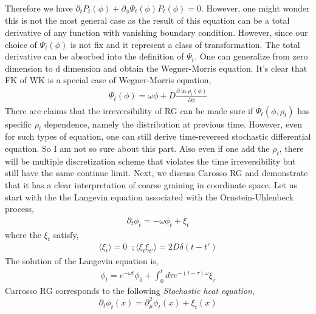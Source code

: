 \documentclass[a4paper,11pt]{article}
\begin{document}
Therefore we have $\partial_tP_{t}(\phi)+ \partial_{\phi}\Psi_t(\phi)P_{t}(\phi)=0$. However, one might wonder this is not the most general case as the result of this equation can be a total derivative of any function with vanishing boundary condition. However, since our choice of $\Psi_t(\phi)$ is not fix and it represent a class of transformation. The total derivative can be absorbed into the definition of $\Psi_t$. One can generalize from zero dimension to d dimension and obtain the Wegner-Morris equation. It's clear that FK of WK is a special case of Wegner-Morris equation,
\begin{equation}
\begin{split}
\Psi_t(\phi)=\omega \phi+ D\frac{\partial \ln \rho_t(\phi)}{\partial \phi}
\end{split}
\end{equation}
There are claims that the irreversibility of RG can be made sure if $\Psi_t(\phi,\rho_t)$ has specific $\rho_t$ dependence, namely the distribution at previous time. {\color{red} However, even for such types of equation, one can still derive time-reversed stochastic differential equation. So I am not so sure about this part. Also even if one add the $\rho_t$, there will be multiple discretization scheme that violates the time irreversibility but still have the same continue limit. } Next, we discuss Carosso RG and demonstrate that it has a clear interpretation of coarse graining in coordinate space. Let us start with the the Langevin equation associated with the Ornstein-Uhlenbeck process,
\begin{equation}
\begin{split}
\partial_t \phi_t=-\omega \phi_t +\xi_t
\end{split}
\end{equation}
where the $\xi_t$ satisfy,
\begin{equation}
\begin{split}
\langle \xi_t \rangle=0 \;\; ;\langle \xi_t \xi_{t'} \rangle=2D\delta(t-t')
\end{split}
\end{equation}
The solution of the Langevin equation is,
\begin{equation}
\begin{split}
\phi_t=e^{-\omega t}\phi_0+ \int_0^t d\tau e^{-(t-\tau)\omega} \xi_{\tau}
\end{split}
\end{equation}
Carrosso RG corresponds to the following \textit{Stochastic heat equation}, 
\begin{equation}
\partial_t \phi_t(x)=\partial^2_\mu \phi_t(x) +\xi_t(x)
\end{equation}
\end{document}
